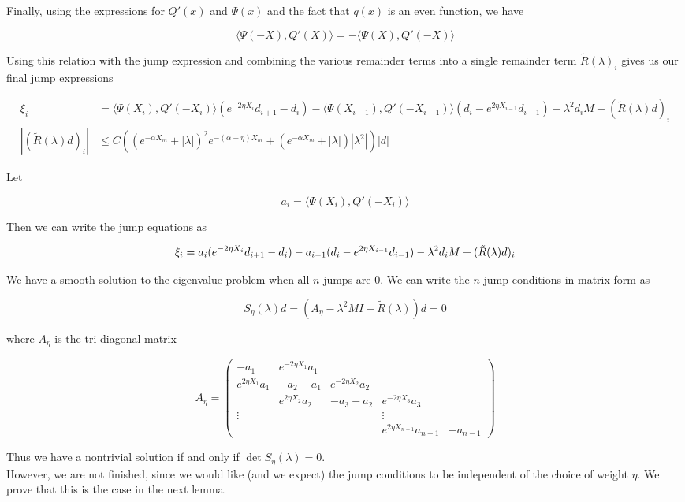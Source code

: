 \documentclass[thesis.tex]{subfiles}
\begin{document}
Finally, using the expressions for $Q'(x)$ and $\Psi(x)$ and the fact that $q(x)$ is an even function, we have

\[
\langle \Psi(-X), Q'(X) \rangle = -\langle \Psi(X), Q'(-X) \rangle
\]

Using this relation with the jump expression and combining the various remainder terms into a single remainder term $\tilde{R}(\lambda)_i$ gives us our final jump expressions

\begin{align*}
\xi_i & = \langle \Psi(X_i), Q'(-X_i) \rangle ( e^{-2 \eta X_i}d_{i+1} - d_i ) 
- \langle \Psi(X_{i-1}), Q'(-X_{i-1}) \rangle (d_i - e^{2 \eta X_{i-1}} d_{i-1} ) - \lambda^2 d_i M  + (\tilde{R}(\lambda)d)_i \\
|(\tilde{R}(\lambda)d)_i| &\leq C 
\left( (e^{-\alpha X_m} + |\lambda|)^2 e^{-(\alpha - \eta)X_m}  
+ (e^{-\alpha X_m} + |\lambda| )|\lambda^2| \right)|d|
\end{align*}

Let 

\[
a_i = \langle \Psi(X_i), Q'(-X_i) \rangle
\]

Then we can write the jump equations as

\[
\xi_i = a_i ( e^{-2 \eta X_i}d_{i+1} - d_i ) 
- a_{i-1} (d_i - e^{2 \eta X_{i-1}} d_{i-1} ) - \lambda^2 d_i M  + (\tilde{R}(\lambda)d)_i \\
\]

We have a smooth solution to the eigenvalue problem when all $n$ jumps are 0. We can write the $n$ jump conditions in matrix form as

\[
S_\eta(\lambda)d = (A_\eta - \lambda^2 M I + \tilde{R}(\lambda))d = 0
\]

where $A_\eta$ is the tri-diagonal matrix

\[
A_\eta = \begin{pmatrix}
-a_1 & e^{-2 \eta X_1} a_1 \\
e^{2 \eta X_1} a_1 & -a_2 - a_1 & e^{-2 \eta X_2} a_2 \\
& e^{2 \eta X_2} a_2 & -a_3 - a_2 & e^{-2 \eta X_3} a_3 \\
\vdots & & & \vdots \\
& & & e^{2 \eta X_{n-1}} a_{n-1} & -a_{n-1} 
\end{pmatrix}
\]

Thus we have a nontrivial solution if and only if $\det S_\eta(\lambda) = 0$.\\

However, we are not finished, since we would like (and we expect) the jump conditions to be independent of the choice of weight $\eta$. We prove that this is the case in the next lemma.
\end{document}
